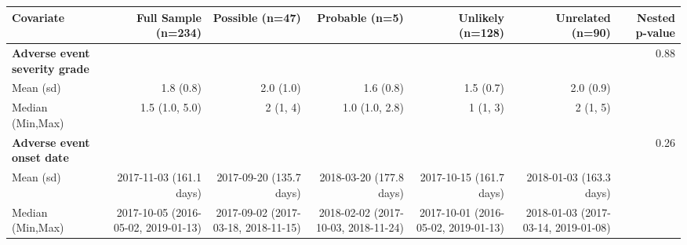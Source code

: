 
\begin{tabular}{lrrrrrr}
\toprule
Covariate & Full Sample (n=234) & Possible (n=47) & Probable (n=5) & Unlikely (n=128) & Unrelated (n=90) & Nested p-value\\
\midrule
\textbf{Adverse event severity grade} &  &  &  &  &  & 0.88\\
\hspace{1em}Mean (sd) & 1.8 (0.8) & 2.0 (1.0) & 1.6 (0.8) & 1.5 (0.7) & 2.0 (0.9) & \\
\hspace{1em}Median (Min,Max) & 1.5 (1.0, 5.0) & 2 (1, 4) & 1.0 (1.0, 2.8) & 1 (1, 3) & 2 (1, 5) & \\
\textbf{Adverse event onset date} &  &  &  &  &  & 0.26\\
\hspace{1em}Mean (sd) & 2017-11-03 (161.1 days) & 2017-09-20 (135.7 days) & 2018-03-20 (177.8 days) & 2017-10-15 (161.7 days) & 2018-01-03 (163.3 days) & \\
\hspace{1em}Median (Min,Max) & 2017-10-05 (2016-05-02, 2019-01-13) & 2017-09-02 (2017-03-18, 2018-11-15) & 2018-02-02 (2017-10-03, 2018-11-24) & 2017-10-01 (2016-05-02, 2019-01-13) & 2018-01-03 (2017-03-14, 2019-01-08) & \\
\bottomrule
\end{tabular}